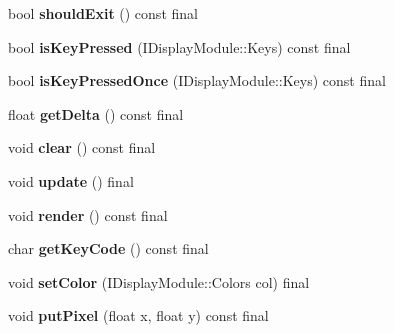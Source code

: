 \begin{DoxyCompactItemize}
\item 
\mbox{\label{classArcade_1_1Display_1_1Libcaca_a5920c296d51d72df55b5079c0749031e}} 
bool {\bfseries should\+Exit} () const final
\item 
\mbox{\label{classArcade_1_1Display_1_1Libcaca_a4d76639289eee2453a416ff0fc051fe3}} 
bool {\bfseries is\+Key\+Pressed} (I\+Display\+Module\+::\+Keys) const final
\item 
\mbox{\label{classArcade_1_1Display_1_1Libcaca_a2de2c9cd935fbee371fa5215bd45c137}} 
bool {\bfseries is\+Key\+Pressed\+Once} (I\+Display\+Module\+::\+Keys) const final
\item 
\mbox{\label{classArcade_1_1Display_1_1Libcaca_a6aee007c10e66709680d1ec80f2662a4}} 
float {\bfseries get\+Delta} () const final
\item 
\mbox{\label{classArcade_1_1Display_1_1Libcaca_a5ee01f197b563692077b27c21f258207}} 
void {\bfseries clear} () const final
\item 
\mbox{\label{classArcade_1_1Display_1_1Libcaca_ae34a6df0b186c523bcc423957c8d5b6d}} 
void {\bfseries update} () final
\item 
\mbox{\label{classArcade_1_1Display_1_1Libcaca_ae41aaff01de7010cab07d8eecf5b292a}} 
void {\bfseries render} () const final
\item 
\mbox{\label{classArcade_1_1Display_1_1Libcaca_a741fdec5c2e77cc7959e5f3444f8c8ac}} 
char {\bfseries get\+Key\+Code} () const final
\item 
\mbox{\label{classArcade_1_1Display_1_1Libcaca_aec7af72c1ffd1a3af05b4d8cf3edf84e}} 
void {\bfseries set\+Color} (I\+Display\+Module\+::\+Colors col) final
\item 
\mbox{\label{classArcade_1_1Display_1_1Libcaca_a857080fd758f300ef2b05563d5814a1f}} 
void {\bfseries put\+Pixel} (float x, float y) const final

\end{DoxyCompactItemize}
